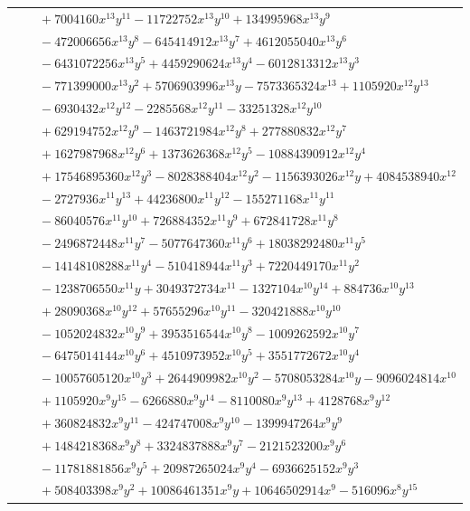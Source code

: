 \documentclass[11pt]{article}
\begin{document}
\begin{longtable}{@{}ll@{}}
 & $\quad +7004160x^{13}y^{11}-11722752x^{13}y^{10}+134995968x^{13}y^{9}$\\
 & $\quad -472006656x^{13}y^{8}-645414912x^{13}y^{7}+4612055040x^{13}y^{6}$\\
 & $\quad -6431072256x^{13}y^{5}+4459290624x^{13}y^{4}-6012813312x^{13}y^{3}$\\
 & $\quad -771399000x^{13}y^{2}+5706903996x^{13}y-7573365324x^{13}+1105920x^{12}y^{13}$\\
 & $\quad -6930432x^{12}y^{12}-2285568x^{12}y^{11}-33251328x^{12}y^{10}$\\
 & $\quad +629194752x^{12}y^{9}-1463721984x^{12}y^{8}+277880832x^{12}y^{7}$\\
 & $\quad +1627987968x^{12}y^{6}+1373626368x^{12}y^{5}-10884390912x^{12}y^{4}$\\
 & $\quad +17546895360x^{12}y^{3}-8028388404x^{12}y^{2}-1156393026x^{12}y+4084538940x^{12}$\\
 & $\quad -2727936x^{11}y^{13}+44236800x^{11}y^{12}-155271168x^{11}y^{11}$\\
 & $\quad -86040576x^{11}y^{10}+726884352x^{11}y^{9}+672841728x^{11}y^{8}$\\
 & $\quad -2496872448x^{11}y^{7}-5077647360x^{11}y^{6}+18038292480x^{11}y^{5}$\\
 & $\quad -14148108288x^{11}y^{4}-510418944x^{11}y^{3}+7220449170x^{11}y^{2}$\\
 & $\quad -1238706550x^{11}y+3049372734x^{11}-1327104x^{10}y^{14}+884736x^{10}y^{13}$\\
 & $\quad +28090368x^{10}y^{12}+57655296x^{10}y^{11}-320421888x^{10}y^{10}$\\
 & $\quad -1052024832x^{10}y^{9}+3953516544x^{10}y^{8}-1009262592x^{10}y^{7}$\\
 & $\quad -6475014144x^{10}y^{6}+4510973952x^{10}y^{5}+3551772672x^{10}y^{4}$\\
 & $\quad -10057605120x^{10}y^{3}+2644909982x^{10}y^{2}-5708053284x^{10}y-9096024814x^{10}$\\
 & $\quad +1105920x^{9}y^{15}-6266880x^{9}y^{14}-8110080x^{9}y^{13}+4128768x^{9}y^{12}$\\
 & $\quad +360824832x^{9}y^{11}-424747008x^{9}y^{10}-1399947264x^{9}y^{9}$\\
 & $\quad +1484218368x^{9}y^{8}+3324837888x^{9}y^{7}-2121523200x^{9}y^{6}$\\
 & $\quad -11781881856x^{9}y^{5}+20987265024x^{9}y^{4}-6936625152x^{9}y^{3}$\\
 & $\quad +508403398x^{9}y^{2}+10086461351x^{9}y+10646502914x^{9}-516096x^{8}y^{15}$\\

\end{longtable}
\end{document}
